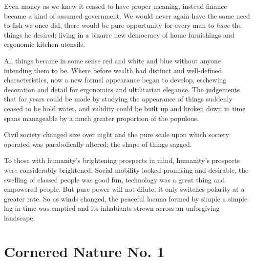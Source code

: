 \documentclass{book}
\begin{document}
Even money as we knew it ceased to have proper meaning, instead finance became
a kind of assumed government. We would never again have the same need to fish
we once did, there would be pure opportunity for every man to \emph{have} the
things he desired; living in a bizarre new democracy of home furnishings and
ergonomic kitchen utensils.

All things became in some sense red and white and blue without anyone intending
them to be. Where before wealth had distinct and well-defined characteristics,
now a new formal appearance began to develop, eschewing decoration and detail
for ergonomics and ultilitarian elegance. The judgements that for years could
be made by studying the appearance of things suddenly ceased to be hold water,
and validity could be built up and broken down in time spans manageable by a
much greater proportion of the populous.

Civil society changed size over night and the pure scale upon which society
operated was parabolically altered; the shape of things sagged.

To those with humanity's brightening prospects in mind, humanity's prospects
were considerably brightened. Social mobility looked promising and desirable,
the swelling of classed people was good fun, technology was a great thing and
empowered people. But pure power will not dilute, it only switches polarity at
a greater rate. So as winds changed, the peaceful lacuna formed by simple a
simple lag in time was emptied and its inhabiants strewn across an unforgiving
landscape.


\chapter{Cornered Nature No. 1}
\end{document}

